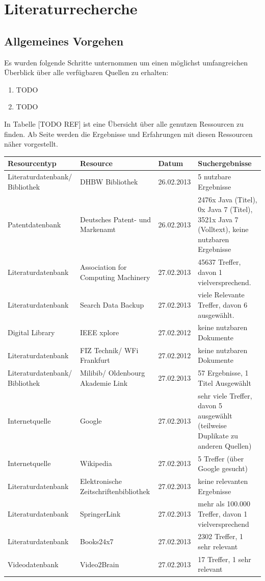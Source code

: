 \section{Literaturrecherche}

\subsection{Allgemeines Vorgehen}

Es wurden folgende Schritte unternommen um einen möglichst umfangreichen Überblick über alle verfügbaren Quellen zu erhalten:
\begin{enumerate}
\item TODO
\item TODO
\end{enumerate}
In Tabelle [TODO REF] ist eine Übersicht über alle genutzen Ressourcen zu finden. Ab Seite \pageref{startdetails} werden die Ergebnisse und Erfahrungen mit diesen Ressourcen näher vorgestellt.

\renewcommand{\arraystretch}{1.5}
\begin{longtable}{p{3.6cm}|p{3.5cm}|l|p{3.5cm}}
Resourcentyp & Resource & Datum & Suchergebnisse\\\hline\endhead
\endfoot\endlastfoot
Literaturdatenbank/ Bibliothek & DHBW Bibliothek & 26.02.2013 & 5 nutzbare Ergebnisse\\
Patentdatenbank & Deutsches Patent- und Markenamt & 26.02.2013 & 2476x Java (Titel), 0x Java 7 (Titel), 3521x Java 7 (Volltext), keine nutzbaren Ergebnisse\\
Literaturdatenbank & Association for Computing Machinery & 27.02.2013 & 45637 Treffer, davon 1 vielversprechend.\\
Literaturdatenbank & Search Data Backup & 27.02.2013 & viele Relevante Treffer, davon 6 ausgewählt.\\
Digital Library & IEEE xplore & 27.02.2012 & keine nutzbaren Dokumente\\
Literaturdatenbank & FIZ Technik/ WFi Frankfurt & 27.02.2012 & keine nutzbaren Dokumente\\
Literaturdatenbank/ Bibliothek & Milibib/ Oldenbourg Akademie Link & 27.02.2013 & 57 Ergebnisse, 1 Titel Ausgewählt\\
Internetquelle & Google & 27.02.2013 & sehr viele Treffer, davon 5 ausgewählt (teilweise Duplikate zu anderen Quellen)\\
Internetquelle & Wikipedia & 27.02.2013 & 5 Treffer (über Google gesucht)\\
Literaturdatenbank & Elektronische Zeitschriftenbibliothek & 27.02.2013 & keine relevanten Ergebnisse\\
Literaturdatenbank & SpringerLink & 27.02.2013 & mehr als 100.000 Treffer, davon 1 vielversprechend\\
Literaturdatenbank & Books24x7 & 27.02.2013 & 2302 Treffer, 1 sehr relevant\\
Videodatenbank & Video2Brain & 27.02.2013 & 17 Treffer, 1 sehr relevant\\
\end{longtable}
\renewcommand{\arraystretch}{1}

